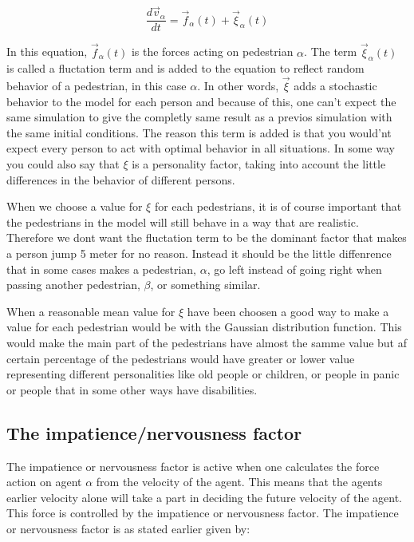 \documentclass[danish,a4paper]{article}
\begin{document}
\begin{equation}
\frac{d\vec{v}_{\alpha}}{dt}=\vec{f}_{\alpha}(t)+\vec{\xi}_{\alpha}(t)
\end{equation}

In this equation, $\vec{f}_{\alpha}(t)$ is the forces acting on pedestrian $\alpha$. The term $\vec{\xi}_{\alpha}(t)$
is called a fluctation term and is added to the equation to reflect random behavior of a pedestrian, in this case $\alpha$. In other words, $\vec{\xi}$ adds a stochastic behavior to the model for each person and because of this, one can't expect the same simulation to give the completly same result as a previos simulation with the same initial conditions. The reason this term is added is that you would'nt expect every person to act with optimal behavior in all situations. In some way you could also say that $\xi$ is a personality factor, taking into account the little differences in the behavior of different persons.

When we choose a value for $\xi$ for each pedestrians, it is of course important that the pedestrians in the model will still behave in a way that are realistic. Therefore we dont want the fluctation term to be the dominant factor that makes a person jump 5 meter for no reason. Instead it should be the little diffenrence that in some cases makes a pedestrian, $\alpha$, go left instead of going right when passing another pedestrian, $\beta$, or something similar.  

When a reasonable mean value for $\xi$ have been choosen a good way to make a value for each pedestrian would be with the Gaussian distribution function. This would make the main part of the pedestrians have almost the samme value but af certain percentage of the pedestrians would have greater or lower value representing different personalities like old people or children, or people in panic or people that in some other ways have disabilities. 


\subsection{The impatience/nervousness factor}
The impatience or nervousness factor is active when one calculates the force action 
on agent $\alpha$ from the velocity of the agent. This means that the agents earlier 
velocity alone will take a part in deciding the future velocity of the agent. This 
force is controlled by the impatience or nervousness factor. The impatience or 
nervousness factor is as stated earlier given by:
\end{document}
